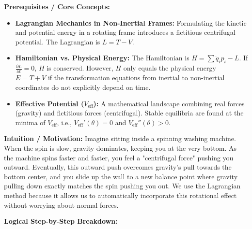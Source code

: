 \begin{solution}
\textbf{Prerequisites / Core Concepts:}
\begin{itemize}
    \item \textbf{Lagrangian Mechanics in Non-Inertial Frames:} Formulating the kinetic and potential energy in a rotating frame introduces a fictitious centrifugal potential. The Lagrangian is $L = T - V$.
    \item \textbf{Hamiltonian vs. Physical Energy:} The Hamiltonian is $H = \sum \dot{q}_i p_i - L$. If $\frac{\partial L}{\partial t} = 0$, $H$ is conserved. However, $H$ only equals the physical energy $E = T + V$ if the transformation equations from inertial to non-inertial coordinates do not explicitly depend on time.
    \item \textbf{Effective Potential ($V_{\text{eff}}$):} A mathematical landscape combining real forces (gravity) and fictitious forces (centrifugal). Stable equilibria are found at the minima of $V_{\text{eff}}$, i.e., $V_{\text{eff}}'(\theta) = 0$ and $V_{\text{eff}}''(\theta) > 0$.
\end{itemize}

\textbf{Intuition / Motivation:}
Imagine sitting inside a spinning washing machine. When the spin is slow, gravity dominates, keeping you at the very bottom. As the machine spins faster and faster, you feel a "centrifugal force" pushing you outward. Eventually, this outward push overcomes gravity's pull towards the bottom center, and you slide up the wall to a new balance point where gravity pulling down exactly matches the spin pushing you out. We use the Lagrangian method because it allows us to automatically incorporate this rotational effect without worrying about normal forces.

\textbf{Logical Step-by-Step Breakdown:}


\end{solution}
